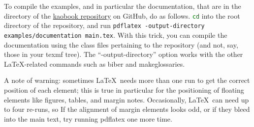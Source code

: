 To compile the examples, and in particular the documentation, that are 
in the  directory of the 
\href{https://github.com/fmarotta/kaobook}{kaobook repository} on 
GitHub, do as follows. \lstinline[language=bash]|cd| into the root 
directory of the repository, and run
\lstinline|pdflatex -output-directory examples/documentation main.tex|. 
With this trick, you can compile the documentation using the class files 
pertaining to the repository (and not, say, those in your texmf tree). 
The \enquote{-output-directory} option works with the other 
\LaTeX-related commands such as biber and makeglossaries.

A note of warning: sometimes \LaTeX\ needs more than one run to get the
correct position of each element; this is true in particular for the
positioning of floating elements like figures, tables, and margin notes.
Occasionally, \LaTeX\ can need up to four re-runs, so If the alignment
of margin elements looks odd, or if they bleed into the main text, try
running pdflatex one more time.
